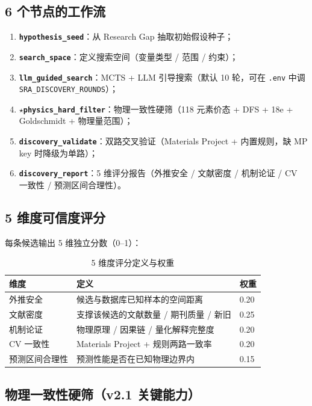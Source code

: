 \documentclass[11pt,a4paper]{article}
\begin{document}
\subsection{6 个节点的工作流}

\begin{enumerate}[leftmargin=2em]
\item \textbf{\texttt{hypothesis\_seed}}：从 Research Gap 抽取初始假设种子；
\item \textbf{\texttt{search\_space}}：定义搜索空间（变量类型 / 范围 / 约束）；
\item \textbf{\texttt{llm\_guided\_search}}：MCTS + LLM 引导搜索（默认 10 轮，可在 \texttt{.env} 中调 \texttt{SRA\_DISCOVERY\_ROUNDS}）；
\item \textbf{$\star$\texttt{physics\_hard\_filter}}：物理一致性硬筛（118 元素价态 + DFS + 18e + Goldschmidt + 物理量范围）；
\item \textbf{\texttt{discovery\_validate}}：双路交叉验证（Materials Project + 内置规则，缺 MP key 时降级为单路）；
\item \textbf{\texttt{discovery\_report}}：5 维评分报告（外推安全 / 文献密度 / 机制论证 / CV 一致性 / 预测区间合理性）。
\end{enumerate}

\subsection{5 维度可信度评分}

每条候选输出 5 维独立分数（0--1）：

\begin{table}[h]
\centering
\caption{5 维度评分定义与权重}
\begin{tabular}{@{}lp{6cm}l@{}}
\toprule
\textbf{维度} & \textbf{定义} & \textbf{权重} \\
\midrule
外推安全 & 候选与数据库已知样本的空间距离 & 0.20 \\
文献密度 & 支撑该候选的文献数量 / 期刊质量 / 新旧 & 0.25 \\
机制论证 & 物理原理 / 因果链 / 量化解释完整度 & 0.20 \\
CV 一致性 & Materials Project + 规则两路一致率 & 0.20 \\
预测区间合理性 & 预测性能是否在已知物理边界内 & 0.15 \\
\bottomrule
\end{tabular}
\end{table}

\subsection{物理一致性硬筛（v2.1 关键能力）}
\end{document}
